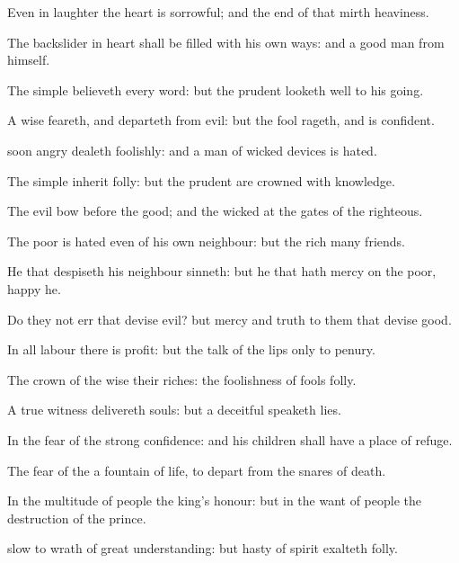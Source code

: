{Even in
laughter the
heart is
sorrowful; and the
end of that
mirth
{}
heaviness.

The
backslider in
heart shall be
filled with his own
ways: and a
good
man
{} from himself.

The
simple
believeth every
word: but the
prudent
{} looketh
well to his
going.

A
wise
{}
feareth, and
departeth from
evil: but the
fool
rageth, and is
confident.

soon
angry
dealeth
foolishly: and a
man of wicked
devices is
hated.

The
simple
inherit
folly: but the
prudent are
crowned with
knowledge.

The
evil
bow
before the
good; and the
wicked at the
gates of the
righteous.

The
poor is
hated even of his own
neighbour: but the
rich
{}
many
friends.

He that
despiseth his
neighbour
sinneth: but he that hath
mercy on the
poor,
happy
{} he.

Do they not
err that
devise
evil? but
mercy and
truth
{} to them that
devise
good.

In all
labour there is
profit: but the
talk of the
lips
{} only to
penury.

The
crown of the
wise
{} their
riches:
{} the
foolishness of
fools
{}
folly.

A
true
witness
delivereth
souls: but a
deceitful
{}
speaketh
lies.


\par }{\PP {}In the
fear of the
{}
{}
strong
confidence: and his
children shall have a place of
refuge.

The
fear of the
{}
{} a
fountain of
life, to
depart from the
snares of
death.

In the
multitude of
people
{} the
king’s
honour: but in the
want of
people
{} the
destruction of the
prince.

slow to
wrath
{} of
great
understanding: but
{}
hasty of
spirit
exalteth
folly.

}
